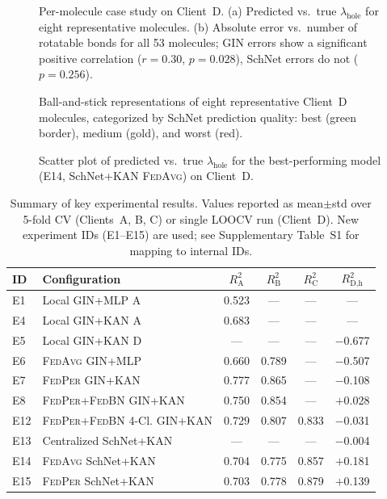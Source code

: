 \documentclass[twocolumn]{article}
\newcommand{\lamhole}{\lambda_{\text{hole}}}
\newcommand{\Rsq}{R^{2}}
\newcommand{\FedPer}{\textsc{FedPer}}
\newcommand{\FedBN}{\textsc{FedBN}}
\newcommand{\FedAvg}{\textsc{FedAvg}}
\begin{document}
\begin{figure}[h]
\centering
\caption{Per-molecule case study on Client~D.
(a) Predicted vs.\ true $\lamhole$ for eight representative molecules.
(b) Absolute error vs.\ number of rotatable bonds for all 53 molecules;
GIN errors show a significant positive correlation ($r = 0.30$, $p = 0.028$), SchNet errors do not ($p = 0.256$).}
\label{fig:case_study}
\end{figure}

\begin{figure}[h]
\centering
\caption{Ball-and-stick representations of eight representative Client~D molecules,
categorized by SchNet prediction quality: best (green border), medium (gold), and worst (red).}
\label{fig:representative_mols}
\end{figure}

\begin{figure}[h]
\centering
\caption{Scatter plot of predicted vs.\ true $\lamhole$ for the best-performing model (E14, SchNet+KAN \FedAvg{}) on Client~D.}
\label{fig:scatter}
\end{figure}

\begin{table}[h]
\centering
\caption{Summary of key experimental results. Values reported as mean$\pm$std over 5-fold CV (Clients~A, B, C) or single LOOCV run (Client~D). New experiment IDs (E1--E15) are used; see Supplementary Table~S1 for mapping to internal IDs.}
\label{tab:summary}
\small
\begin{tabular}{@{}llcccc@{}}
\toprule
ID & Configuration & $\Rsq_\text{A}$ & $\Rsq_\text{B}$ & $\Rsq_\text{C}$ & $\Rsq_\text{D,h}$ \\
\midrule
E1 & Local GIN+MLP A          & 0.523 & ---   & ---   & ---    \\
E4 & Local GIN+KAN A          & 0.683 & ---   & ---   & ---    \\
E5 & Local GIN+KAN D          & ---   & ---   & ---   & $-$0.677 \\
E6 & \FedAvg{} GIN+MLP        & 0.660 & 0.789 & ---   & $-$0.507 \\
E7 & \FedPer{} GIN+KAN        & 0.777 & 0.865 & ---   & $-$0.108 \\
E8 & \FedPer{}+\FedBN{} GIN+KAN & 0.750 & 0.854 & ---   & $+$0.028 \\
E12 & \FedPer{}+\FedBN{} 4-Cl. GIN+KAN & 0.729 & 0.807 & 0.833 & $-$0.031 \\
E13 & Centralized SchNet+KAN  & ---   & ---   & ---   & $-$0.004 \\
E14 & \FedAvg{} SchNet+KAN    & 0.704 & 0.775 & 0.857 & $+$0.181 \\
E15 & \FedPer{} SchNet+KAN    & 0.703 & 0.778 & 0.879 & $+$0.139 \\
\bottomrule
\end{tabular}
\end{table}
\end{document}
